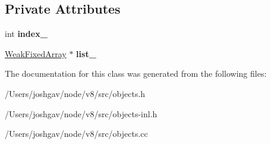 \subsection*{Private Attributes}
\begin{DoxyCompactItemize}
\item 
int {\bfseries index\+\_\+}\hypertarget{classv8_1_1internal_1_1_weak_fixed_array_1_1_iterator_a56b7f53d2831d3b9d36d5bc784f1e8c4}{}\label{classv8_1_1internal_1_1_weak_fixed_array_1_1_iterator_a56b7f53d2831d3b9d36d5bc784f1e8c4}

\item 
\hyperlink{classv8_1_1internal_1_1_weak_fixed_array}{Weak\+Fixed\+Array} $\ast$ {\bfseries list\+\_\+}\hypertarget{classv8_1_1internal_1_1_weak_fixed_array_1_1_iterator_a074ab0be2de910c346920cf7b9d6e2d6}{}\label{classv8_1_1internal_1_1_weak_fixed_array_1_1_iterator_a074ab0be2de910c346920cf7b9d6e2d6}

\end{DoxyCompactItemize}


The documentation for this class was generated from the following files\+:\begin{DoxyCompactItemize}
\item 
/\+Users/joshgav/node/v8/src/objects.\+h\item 
/\+Users/joshgav/node/v8/src/objects-\/inl.\+h\item 
/\+Users/joshgav/node/v8/src/objects.\+cc\end{DoxyCompactItemize}
